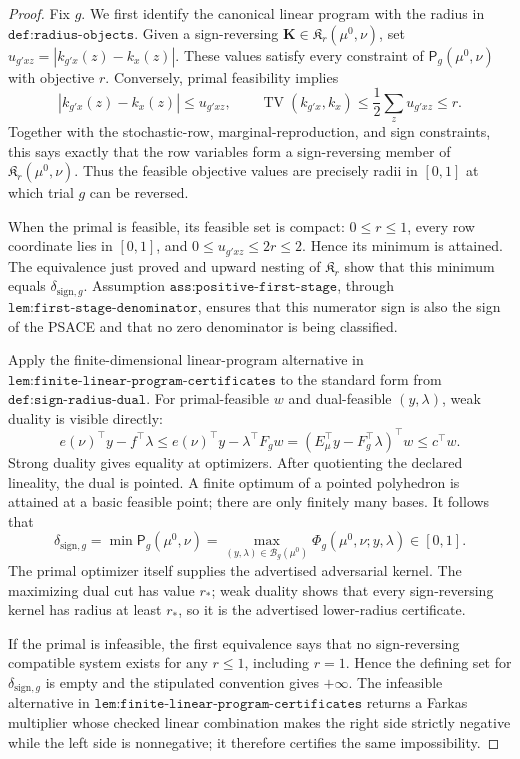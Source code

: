 \documentclass{article}
\begin{document}
\begin{proof}
Fix \(g\).  We first identify the canonical linear program with the radius in \(\texttt{def:radius-objects}\).  Given a sign-reversing \(\mathbf K\in\mathfrak K_r(\mu^0,\nu)\), set
\(u_{g'xz}=|k_{g'x}(z)-k_x(z)|\).  These values satisfy every constraint of \(\mathsf P_g(\mu^0,\nu)\) with objective \(r\).  Conversely, primal feasibility implies
\[
 |k_{g'x}(z)-k_x(z)|\le u_{g'xz},
 \qquad
 \operatorname{TV}(k_{g'x},k_x)
 \le\frac12\sum_z u_{g'xz}\le r.
\]
Together with the stochastic-row, marginal-reproduction, and sign constraints, this says exactly that the row variables form a sign-reversing member of \(\mathfrak K_r(\mu^0,\nu)\).  Thus the feasible objective values are precisely radii in \([0,1]\) at which trial \(g\) can be reversed.

When the primal is feasible, its feasible set is compact: \(0\le r\le1\), every row coordinate lies in \([0,1]\), and \(0\le u_{g'xz}\le2r\le2\).  Hence its minimum is attained.  The equivalence just proved and upward nesting of \(\mathfrak K_r\) show that this minimum equals \(\delta_{\mathrm{sign},g}\).  Assumption \(\texttt{ass:positive-first-stage}\), through \(\texttt{lem:first-stage-denominator}\), ensures that this numerator sign is also the sign of the PSACE and that no zero denominator is being classified.

Apply the finite-dimensional linear-program alternative in \(\texttt{lem:finite-linear-program-certificates}\) to the standard form from \(\texttt{def:sign-radius-dual}\).  For primal-feasible \(w\) and dual-feasible \((y,\lambda)\), weak duality is visible directly:
\[
 e(\nu)^{\top}y-f^{\top}\lambda
 \le e(\nu)^{\top}y-\lambda^{\top}F_gw
 =(E_\mu^{\top}y-F_g^{\top}\lambda)^{\top}w
 \le c^{\top}w.
\]
Strong duality gives equality at optimizers.  After quotienting the declared lineality, the dual is pointed.  A finite optimum of a pointed polyhedron is attained at a basic feasible point; there are only finitely many bases.  It follows that
\[
 \delta_{\mathrm{sign},g}
 =\min\mathsf P_g(\mu^0,\nu)
 =\max_{(y,\lambda)\in\mathcal B_g(\mu^0)}
   \Phi_g(\mu^0,\nu;y,\lambda)\in[0,1].
\]
The primal optimizer itself supplies the advertised adversarial kernel.  The maximizing dual cut has value \(r_*\); weak duality shows that every sign-reversing kernel has radius at least \(r_*\), so it is the advertised lower-radius certificate.

If the primal is infeasible, the first equivalence says that no sign-reversing compatible system exists for any \(r\le1\), including \(r=1\).  Hence the defining set for \(\delta_{\mathrm{sign},g}\) is empty and the stipulated convention gives \(+\infty\).  The infeasible alternative in \(\texttt{lem:finite-linear-program-certificates}\) returns a Farkas multiplier whose checked linear combination makes the right side strictly negative while the left side is nonnegative; it therefore certifies the same impossibility.


\end{proof}
\end{document}
